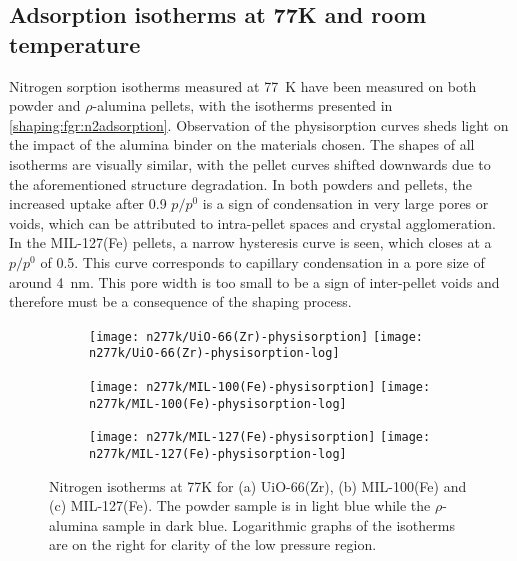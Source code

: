 
\subsection{Adsorption isotherms at 77K and room temperature}

Nitrogen sorption isotherms measured at \SI{77}{\kelvin} have been
measured on both powder and \(\rho\)-alumina pellets, with the isotherms
presented in \autoref{shaping:fgr:n2adsorption}.
Observation of the physisorption curves sheds light on the
impact of the alumina binder on the materials chosen.
The shapes of all isotherms are visually similar, with the pellet curves
shifted downwards due to the aforementioned structure degradation.
In both powders and pellets, the increased uptake after 0.9 \(p/p^0\)
is a sign of condensation in very large pores or voids, which can
be attributed to intra-pellet spaces and crystal agglomeration.
In the MIL-127(Fe) pellets, a narrow hysteresis curve is seen,
which closes at a \(p/p^0\) of 0.5. This curve corresponds to
capillary condensation in a pore size of around \SI{4}{\nano\metre}.
This pore width is too small to be a sign of
inter-pellet voids and therefore must be a consequence of the shaping
process.

\begin{figure}[p!]
	\centering

	\begin{subfigure}{\linewidth}
		\centering
		\parbox[c]{0.1\linewidth}{\caption{}\label{shaping:fgr:n277kuio66}}%
		\texttt{[image: n277k/UiO-66(Zr)-physisorption]}%
		\texttt{[image: n277k/UiO-66(Zr)-physisorption-log]}%
	\end{subfigure}

	\begin{subfigure}{\linewidth}
		\centering
		\parbox[c]{0.1\linewidth}{\caption{}\label{shaping:fgr:n277kmil100}}%
		\texttt{[image: n277k/MIL-100(Fe)-physisorption]}%
		\texttt{[image: n277k/MIL-100(Fe)-physisorption-log]}%
	\end{subfigure}

	\begin{subfigure}{\linewidth}
		\centering
		\parbox[c]{0.1\linewidth}{\caption{}\label{shaping:fgr:n277kmil127}}%
		\texttt{[image: n277k/MIL-127(Fe)-physisorption]}%
		\texttt{[image: n277k/MIL-127(Fe)-physisorption-log]}%
	\end{subfigure}

	\caption{Nitrogen isotherms at 77K for (a) UiO-66(Zr),
		(b) MIL-100(Fe) and (c) MIL-127(Fe). The powder sample is in light
		blue while the \(\rho\)-alumina sample in dark blue. Logarithmic
		graphs of the isotherms are on the right for clarity of the low
		pressure region.}%
	\label{shaping:fgr:n2adsorption}
\end{figure}

